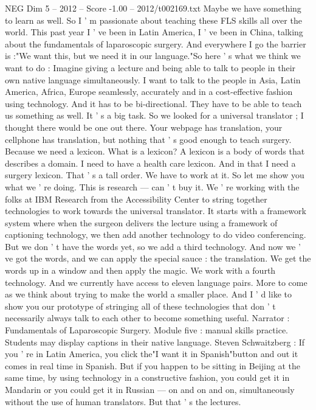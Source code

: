 \begin{textsample}{NEG Dim 5 – 2012 – Score -1.00 – 2012/t002169.txt}
Maybe we have something to learn as well.
So I ' m passionate about teaching these FLS skills all over the world.
This past year I ' ve been in Latin America, I ' ve been in China, talking about the fundamentals of laparoscopic surgery.
And everywhere I go the barrier is :"We want this, but we need it in our language."So here ' s what we think we want to do : Imagine giving a lecture and being able to talk to people in their own native language simultaneously.
I want to talk to the people in Asia, Latin America, Africa, Europe seamlessly, accurately and in a cost-effective fashion using technology.
And it has to be bi-directional.
They have to be able to teach us something as well.
It ' s a big task.
So we looked for a universal translator ; I thought there would be one out there.
Your webpage has translation, your cellphone has translation, but nothing that ' s good enough to teach surgery.
Because we need a lexicon.
What is a lexicon?
A lexicon is a body of words that describes a domain.
I need to have a health care lexicon.
And in that I need a surgery lexicon.
That ' s a tall order.
We have to work at it.
So let me show you what we ' re doing.
This is research — can ' t buy it.
We ' re working with the folks at IBM Research from the Accessibility Center to string together technologies to work towards the universal translator.
It starts with a framework system where when the surgeon delivers the lecture using a framework of captioning technology, we then add another technology to do video conferencing.
But we don ' t have the words yet, so we add a third technology.
And now we ' ve got the words, and we can apply the special sauce : the translation.
We get the words up in a window and then apply the magic.
We work with a fourth technology.
And we currently have access to eleven language pairs.
More to come as we think about trying to make the world a smaller place.
And I ' d like to show you our prototype of stringing all of these technologies that don ' t necessarily always talk to each other to become something useful.
Narrator : Fundamentals of Laparoscopic Surgery.
Module five : manual skills practice.
Students may display captions in their native language.
Steven Schwaitzberg : If you ' re in Latin America, you click the"I want it in Spanish"button and out it comes in real time in Spanish.
But if you happen to be sitting in Beijing at the same time, by using technology in a constructive fashion, you could get it in Mandarin or you could get it in Russian — on and on and on, simultaneously without the use of human translators.
But that ' s the lectures.

\end{textsample}

